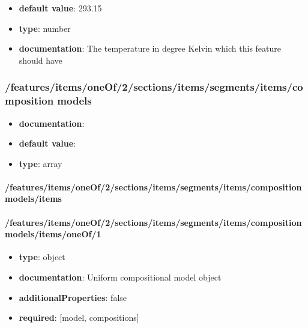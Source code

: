 \begin{itemize}\item {\bf default value}: 293.15
\item {\bf type}: number
\item {\bf documentation}: The temperature in degree Kelvin which this feature should have
\end{itemize}\subsubsection{/features/items/oneOf/2/sections/items/segments/items/composition models}
\begin{itemize}\item {\bf documentation}: 
\item {\bf default value}: 
\item {\bf type}: array
\end{itemize}\paragraph{/features/items/oneOf/2/sections/items/segments/items/composition models/items}

\paragraph{/features/items/oneOf/2/sections/items/segments/items/composition models/items/oneOf/1}
\begin{itemize}\item {\bf type}: object
\item {\bf documentation}: Uniform compositional model object
\item {\bf additionalProperties}: false
\item {\bf required}: [model, compositions]\end{itemize}
